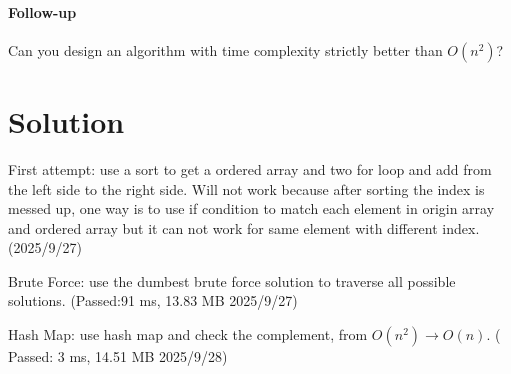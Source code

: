 \documentclass[12pt]{article}
\begin{document}
    \paragraph{Follow-up}
    Can you design an algorithm with time complexity strictly better than 
        \(O(n^{2})\)?

\section*{Solution}
    First attempt: use a sort to get a ordered array and two for loop and add
        from the left side to the right side. Will not work because after 
        sorting the index is messed up, one way is to use if condition to match
        each element in origin array and ordered array but it can not work for
        same element with different index. (2025/9/27)

    Brute Force: use the dumbest brute force solution to traverse all 
        possible solutions. (Passed:91 ms, 13.83 MB 2025/9/27)

    Hash Map: use hash map and check the complement, from $O(n^2) \to O(n)$. (
        Passed: 3 ms, 14.51 MB 2025/9/28)

    

    
\end{document}
